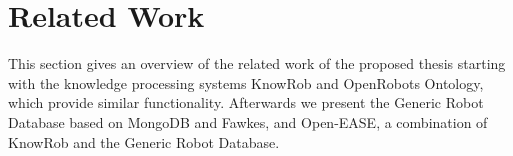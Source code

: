 \documentclass[a4paper,11pt]{article}
\begin{document}

\section{Related Work}
\label{sec:related}
This section gives an overview of the related work of the proposed
thesis starting with the knowledge processing systems KnowRob and
OpenRobots Ontology, which provide similar functionality. Afterwards
we present the Generic Robot Database based on MongoDB and Fawkes, and
Open-EASE, a combination of KnowRob and the Generic Robot Database.
\end{document}
